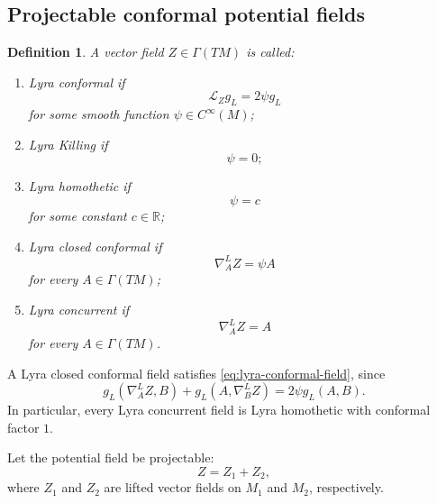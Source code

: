 \documentclass[a4paper,11pt]{article}
\theoremstyle{plain}
\newtheorem{definition}{Definition}[section]
\numberwithin{equation}{section}
\begin{document}
\subsection{Projectable conformal potential fields}
\label{subsec:projectable-conformal-potentials}

\begin{definition}
	\label{def:lyra-special-vector-fields}
	A vector field \(Z\in\Gamma(TM)\) is called:
	\begin{enumerate}
		\item \emph{Lyra conformal} if
		\begin{equation}
			\mathcal L_{Z}g_{L}
			=
			2\psi g_{L}
			\label{eq:lyra-conformal-field}
		\end{equation}
		for some smooth function
		\(\psi\in C^{\infty}(M)\);
		
		\item \emph{Lyra Killing} if
		\[
		\psi=0;
		\]
		
		\item \emph{Lyra homothetic} if
		\[
		\psi=c
		\]
		for some constant \(c\in\mathbb R\);
		
		\item \emph{Lyra closed conformal} if
		\begin{equation}
			\nabla^{L}_{A}Z
			=
			\psi A
			\label{eq:lyra-closed-conformal-field}
		\end{equation}
		for every \(A\in\Gamma(TM)\);
		
		\item \emph{Lyra concurrent} if
		\begin{equation}
			\nabla^{L}_{A}Z
			=
			A
			\label{eq:lyra-concurrent-field}
		\end{equation}
		for every \(A\in\Gamma(TM)\).
	\end{enumerate}
\end{definition}

A Lyra closed conformal field satisfies
\eqref{eq:lyra-conformal-field}, since
\[
g_{L}(\nabla^{L}_{A}Z,B)
+
g_{L}(A,\nabla^{L}_{B}Z)
=
2\psi g_{L}(A,B).
\]
In particular, every Lyra concurrent field is Lyra homothetic with
conformal factor \(1\).

Let the potential field be projectable:
\begin{equation}
	Z=Z_{1}+Z_{2},
	\label{eq:special-projectable-potential}
\end{equation}
where \(Z_{1}\) and \(Z_{2}\) are lifted vector fields on
\(M_{1}\) and \(M_{2}\), respectively.
\end{document}
